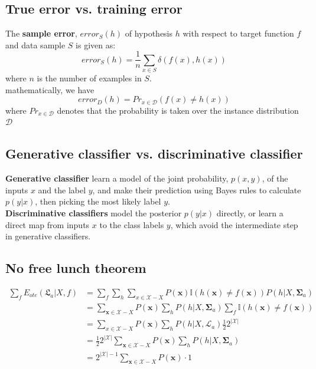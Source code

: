 \begin{refsection}
\subsection{True error vs. training error}
The \textbf{sample error}, $error_S(h)$ of hypothesis $h$ with respect to target function $f$ and data sample $S$ is given as:
$$error_S(h)=\frac{1}{n}\sum_{x\in S}\delta(f(x),h(x))$$
where $n$ is the number of examples in $S$.\\
 mathematically, we have
$$error_D(h) = Pr_{x \in \mathcal{D}}(f(x)\neq h(x))$$
where $Pr_{x \in \mathcal{D}}$ denotes that the probability is taken over the instance distribution $\mathcal{D}$



\subsection{Generative classifier vs. discriminative classifier }\cite{jordan2002discriminative}
\textbf{Generative classifier} learn a model of the joint probability, $p(x,y)$, of the inputs $x$ and the label $y$, and make their prediction using Bayes rules to calculate $p(y|x)$, then picking the most likely label $y$.\\
\textbf{Discriminative classifiers} model the posterior $p(y|x)$ directly, or learn a direct map from inputs $x$ to the class labels $y$, which avoid the intermediate step in generative classifiers. 

\subsection{No free lunch theorem}


\begin{align*} 
\sum_{f} E_{o t e}\left(\mathfrak{L}_{a} | X, f\right) &=\sum_{f} \sum_{h} \sum_{x \in \mathcal{X}-X} P(\boldsymbol{x}) \mathbb{I}(h(\boldsymbol{x}) \neq f(\boldsymbol{x})) P\left(h | X, \boldsymbol{\Sigma}_{a}\right) \\ &=\sum_{\boldsymbol{x} \in \mathcal{X}-X} P(\boldsymbol{x}) \sum_{h} P\left(h | X, \boldsymbol{\Sigma}_{a}\right) \sum_{f} \mathbb{I}(h(\boldsymbol{x}) \neq f(\boldsymbol{x})) \\ &=\sum_{x \in \mathcal{X}-X} P(\boldsymbol{x}) \sum_{h} P\left(h | X, \mathcal{L}_{a}\right) \frac{1}{2} 2^{|\mathcal{X}|} \\ &=\frac{1}{2} 2^{|\mathcal{X}|} \sum_{\boldsymbol{x} \in \mathcal{X}-X} P(\boldsymbol{x}) \sum_{h} P\left(h | X, \boldsymbol{\Sigma}_{a}\right) \\
&=2^{|\mathcal{X}|-1} \sum_{\boldsymbol{x} \in \mathcal{X}-X} P(\boldsymbol{x}) \cdot 1
\end{align*}




\end{refsection}
